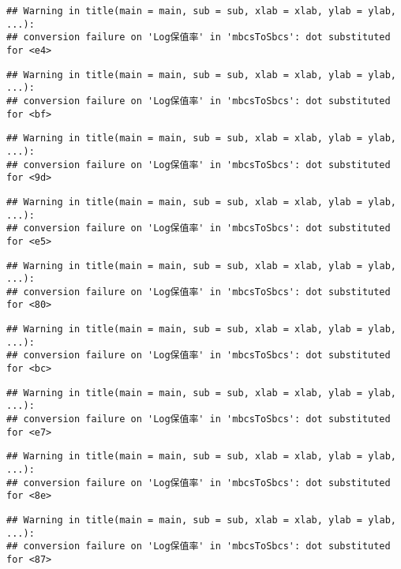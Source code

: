 \documentclass[]{article}
\begin{document}
\begin{verbatim}
## Warning in title(main = main, sub = sub, xlab = xlab, ylab = ylab, ...):
## conversion failure on 'Log保值率' in 'mbcsToSbcs': dot substituted for <e4>
\end{verbatim}

\begin{verbatim}
## Warning in title(main = main, sub = sub, xlab = xlab, ylab = ylab, ...):
## conversion failure on 'Log保值率' in 'mbcsToSbcs': dot substituted for <bf>
\end{verbatim}

\begin{verbatim}
## Warning in title(main = main, sub = sub, xlab = xlab, ylab = ylab, ...):
## conversion failure on 'Log保值率' in 'mbcsToSbcs': dot substituted for <9d>
\end{verbatim}

\begin{verbatim}
## Warning in title(main = main, sub = sub, xlab = xlab, ylab = ylab, ...):
## conversion failure on 'Log保值率' in 'mbcsToSbcs': dot substituted for <e5>
\end{verbatim}

\begin{verbatim}
## Warning in title(main = main, sub = sub, xlab = xlab, ylab = ylab, ...):
## conversion failure on 'Log保值率' in 'mbcsToSbcs': dot substituted for <80>
\end{verbatim}

\begin{verbatim}
## Warning in title(main = main, sub = sub, xlab = xlab, ylab = ylab, ...):
## conversion failure on 'Log保值率' in 'mbcsToSbcs': dot substituted for <bc>
\end{verbatim}

\begin{verbatim}
## Warning in title(main = main, sub = sub, xlab = xlab, ylab = ylab, ...):
## conversion failure on 'Log保值率' in 'mbcsToSbcs': dot substituted for <e7>
\end{verbatim}

\begin{verbatim}
## Warning in title(main = main, sub = sub, xlab = xlab, ylab = ylab, ...):
## conversion failure on 'Log保值率' in 'mbcsToSbcs': dot substituted for <8e>
\end{verbatim}

\begin{verbatim}
## Warning in title(main = main, sub = sub, xlab = xlab, ylab = ylab, ...):
## conversion failure on 'Log保值率' in 'mbcsToSbcs': dot substituted for <87>
\end{verbatim}
\end{document}
